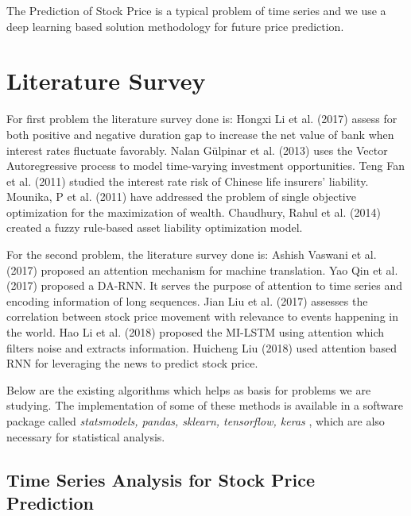 		The Prediction of Stock Price is a typical problem of time series and we use a deep learning based solution methodology for future price prediction.

\section{Literature Survey}

	For first problem the literature survey done is: Hongxi Li et al. (2017) assess for both positive and negative duration gap to increase the net value of bank when interest rates fluctuate favorably\cite{4}. Nalan Gülpinar et al. (2013) uses the Vector Autoregressive process to model time-varying investment opportunities\cite{3}. Teng Fan et al. (2011) studied the interest rate risk of Chinese life insurers’ liability\cite{1}. Mounika, P et al. (2011) have addressed the problem of single objective optimization for the maximization of wealth\cite{16}. Chaudhury, Rahul et al. (2014) created a fuzzy rule-based asset liability optimization model\cite{17}.

	For the second problem, the literature survey done is: Ashish Vaswani et al. (2017) proposed an attention mechanism for machine translation\cite{2}. Yao Qin et al. (2017) proposed a DA-RNN. It serves the purpose of attention to time series and encoding information of long sequences\cite{6}. Jian Liu et al. (2017) assesses the correlation between stock price movement with relevance to events happening in the world\cite{7}. Hao Li et al. (2018) proposed the MI-LSTM using attention which filters noise and extracts information\cite{8}. Huicheng Liu (2018) used attention based RNN for leveraging the news to predict stock price\cite{9}.

Below are the existing algorithms which helps as basis for problems we are studying. The implementation of some of these methods is available in a software package called \emph{statsmodels, pandas, sklearn, tensorflow, keras} \cite{5} \cite{12} \cite{14} \cite{15}, which are also necessary for statistical analysis.



\subsection{Time Series Analysis for Stock Price Prediction}

